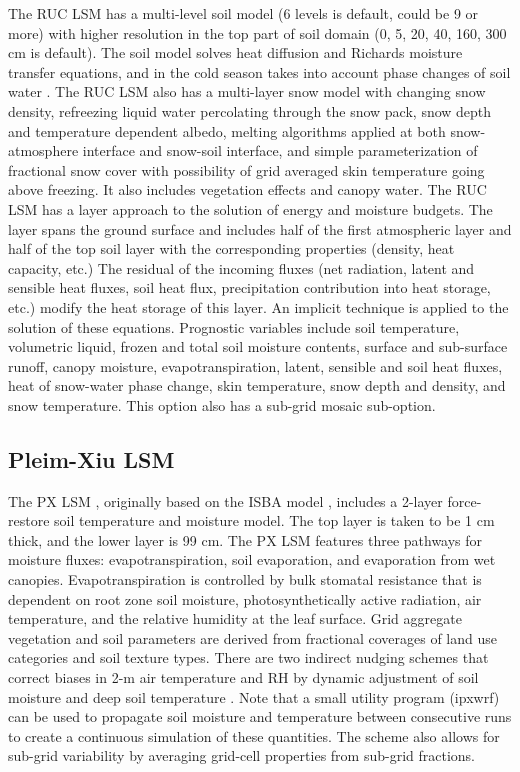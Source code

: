 The RUC LSM has a multi-level soil model (6 levels is default, could be 9 or more) with higher resolution in the top part of soil domain 
(0, 5, 20, 40, 160, 300 cm is default). The soil model solves heat diffusion and Richards moisture transfer equations, and in the cold season
takes into account phase changes of soil water \citep{smirnova97, smirnova00}. 
The RUC LSM also has a multi-layer snow model with changing snow density, refreezing liquid water 
percolating through the snow pack, snow depth and temperature dependent albedo, melting algorithms applied at both 
snow-atmosphere interface and snow-soil interface, and simple parameterization of fractional snow cover with possibility of 
grid averaged skin temperature going above freezing. It also includes vegetation effects and canopy water.
The RUC LSM has a layer approach to the solution of energy and moisture budgets. 
The layer spans the ground surface and includes half of the first atmospheric layer and half of the top soil layer with the 
corresponding properties (density, heat capacity, etc.) The residual of the incoming fluxes (net radiation, latent and sensible heat fluxes, 
soil heat flux, precipitation contribution into heat storage, etc.) modify the heat storage of this layer. 
An implicit technique is applied to the solution of these equations.
Prognostic variables include soil temperature, volumetric liquid, frozen and total soil moisture contents, 
surface and sub-surface runoff, canopy moisture, evapotranspiration, latent, sensible and soil heat fluxes, 
heat of snow-water phase change, skin temperature, snow depth and density, and snow temperature. 
This option also has a sub-grid mosaic sub-option.

\subsection{Pleim-Xiu LSM}

The PX LSM \citep{pleim95, xiu01}, originally based on the ISBA model \citet{noilhan89}, includes a 2-layer force-restore soil temperature and moisture model.  The top layer is taken to be 1 cm thick, and the lower layer is 99 cm. The PX LSM features three pathways for moisture fluxes: evapotranspiration, soil evaporation, and evaporation from wet canopies.  Evapotranspiration is controlled by bulk stomatal resistance that is dependent on root zone soil moisture, photosynthetically active radiation, air temperature, and the relative humidity at the leaf surface.   Grid aggregate vegetation and soil parameters are derived from fractional coverages of land use categories and soil texture types.  There are two indirect nudging schemes that correct biases in 2-m air temperature and RH by dynamic adjustment of soil moisture \citep{pleim03} and deep soil temperature \citep{pleim08}.  Note that a small utility program (ipxwrf) can be used to propagate soil moisture and temperature between consecutive runs to create a continuous simulation of these quantities. The scheme also
allows for sub-grid variability by averaging grid-cell properties from sub-grid fractions.


